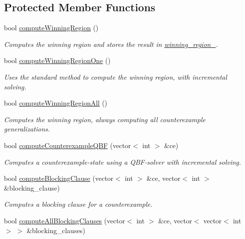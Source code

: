 \subsection*{Protected Member Functions}
\begin{DoxyCompactItemize}
\item 
bool \hyperlink{classLearnSynthQBFInc_a2dc9fff9a414a40059a1d89e19b48252}{compute\-Winning\-Region} ()
\begin{DoxyCompactList}\small\item\em Computes the winning region and stores the result in \hyperlink{classLearnSynthQBFInc_abc3503bdb6be7053a7c3d3d7e57858d6}{winning\-\_\-region\-\_\-}. \end{DoxyCompactList}\item 
bool \hyperlink{classLearnSynthQBFInc_ab1090850d850dfcc0dacbf43426910ca}{compute\-Winning\-Region\-One} ()
\begin{DoxyCompactList}\small\item\em Uses the standard method to compute the winning region, with incremental solving. \end{DoxyCompactList}\item 
bool \hyperlink{classLearnSynthQBFInc_a796673a80bbba7c8b4b7b5b9e4c8332a}{compute\-Winning\-Region\-All} ()
\begin{DoxyCompactList}\small\item\em Computes the winning region, always computing all counterexample generalizations. \end{DoxyCompactList}\item 
bool \hyperlink{classLearnSynthQBFInc_ac30a0ff65a78a651d7760c4802485355}{compute\-Counterexample\-Q\-B\-F} (vector$<$ int $>$ \&ce)
\begin{DoxyCompactList}\small\item\em Computes a counterexample-\/state using a Q\-B\-F-\/solver with incremental solving. \end{DoxyCompactList}\item 
bool \hyperlink{classLearnSynthQBFInc_a52cfd07ff4d94cb9f42eed732ca166dd}{compute\-Blocking\-Clause} (vector$<$ int $>$ \&ce, vector$<$ int $>$ \&blocking\-\_\-clause)
\begin{DoxyCompactList}\small\item\em Computes a blocking clause for a counterexample. \end{DoxyCompactList}\item 
bool \hyperlink{classLearnSynthQBFInc_a979ac9b4cb4d6a8017da2a5e2ba97c82}{compute\-All\-Blocking\-Clauses} (vector$<$ int $>$ \&ce, vector$<$ vector$<$ int $>$ $>$ \&blocking\-\_\-clauses)

\end{DoxyCompactItemize}
